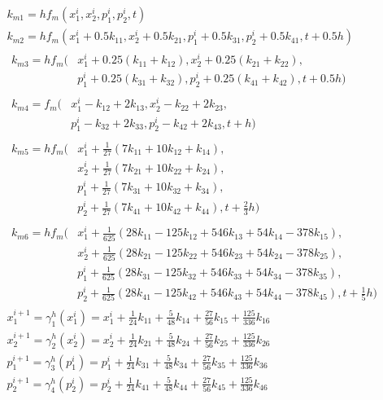 \documentclass[a4paper,12pt]{article}
\begin{document}
\begin{gather*}
  k_{m1}=h f_m(x_1^i,x_2^i,p_1^i,p_2^i, t) \\ 
  k_{m2}=h f_m(x_1^i + 0.5 k_{11},x_2^i + 0.5 k_{21},p_1^i + 0.5 k_{31},p_2^i + 0.5 k_{41}, t + 0.5 h) \\ 
  \begin{align*}
    k_{m3}=h f_m(&x_1^i + 0.25 (k_{11}+k_{12}),x_2^i + 0.25 (k_{21}+k_{22}),\\
                 &p_1^i + 0.25 (k_{31}+k_{32}),p_2^i + 0.25 (k_{41}+k_{42}), t + 0.5 h)
  \end{align*} \\
  \begin{align*}
    k_{m4}=f_m(&x_1^i - k_{12} + 2 k_{13},x_2^i - k_{22} + 2 k_{23},\\
               &p_1^i - k_{32} + 2 k_{33},p_2^i - k_{42} + 2 k_{43}, t + h)
  \end{align*} \\
  \begin{align*}
    k_{m5}=h f_m(&x_1^i + \frac{1}{27}(7 k_{11}+10 k_{12}+k_{14}),\\
                 &x_2^i + \frac{1}{27}(7 k_{21}+10 k_{22}+k_{24}),\\
                 &p_1^i + \frac{1}{27}(7 k_{31}+10 k_{32}+k_{34}),\\
                 &p_2^i + \frac{1}{27}(7 k_{41}+10 k_{42}+k_{44}), t + \frac{2}{3} h)
  \end{align*} \\
  \begin{align*}
    k_{m6}=h f_m(&x_1^i + \frac{1}{625}(28 k_{11}-125 k_{12}+ 546 k_{13}+54 k_{14}-378 k_{15}),\\
                 &x_2^i + \frac{1}{625}(28 k_{21}-125 k_{22}+ 546 k_{23}+54 k_{24}-378 k_{25}),\\
                 &p_1^i + \frac{1}{625}(28 k_{31}-125 k_{32}+ 546 k_{33}+54 k_{34}-378 k_{35}),\\
                 &p_2^i + \frac{1}{625}(28 k_{41}-125 k_{42}+ 546 k_{43}+54 k_{44}-378 k_{45}), t + \frac{1}{5} h)
  \end{align*} \\
  x_1^{i+1}=\gamma_1^h(x_1^i)=x_1^{i} + \frac{1}{24}k_{11} + \frac{5}{48} k_{14} + \frac{27}{56} k_{15} + \frac{125}{336} k_{16} \\ 
  x_2^{i+1}=\gamma_2^h(x_2^i)=x_2^{i} + \frac{1}{24}k_{21} + \frac{5}{48} k_{24} + \frac{27}{56} k_{25} + \frac{125}{336} k_{26} \\ 
  p_1^{i+1}=\gamma_3^h(p_1^i)=p_1^{i} + \frac{1}{24}k_{31} + \frac{5}{48} k_{34} + \frac{27}{56} k_{35} + \frac{125}{336} k_{36} \\ 
  p_2^{i+1}=\gamma_4^h(p_2^i)=p_2^{i} + \frac{1}{24}k_{41} + \frac{5}{48} k_{44} + \frac{27}{56} k_{45} + \frac{125}{336} k_{46}
\end{gather*}
\end{document}

